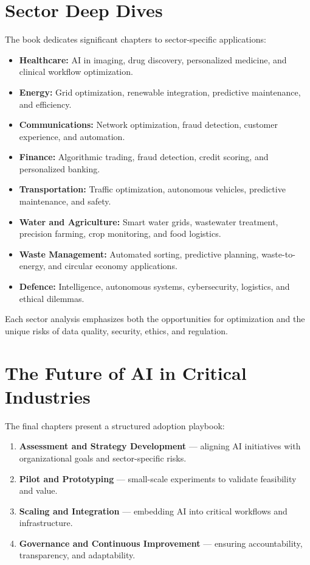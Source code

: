 \section*{Sector Deep Dives}
The book dedicates significant chapters to sector-specific applications: 
\begin{itemize}
    \item \textbf{Healthcare:} AI in imaging, drug discovery, personalized medicine, and clinical workflow optimization. 
    \item \textbf{Energy:} Grid optimization, renewable integration, predictive maintenance, and efficiency. 
    \item \textbf{Communications:} Network optimization, fraud detection, customer experience, and automation. 
    \item \textbf{Finance:} Algorithmic trading, fraud detection, credit scoring, and personalized banking. 
    \item \textbf{Transportation:} Traffic optimization, autonomous vehicles, predictive maintenance, and safety. 
    \item \textbf{Water and Agriculture:} Smart water grids, wastewater treatment, precision farming, crop monitoring, and food logistics. 
    \item \textbf{Waste Management:} Automated sorting, predictive planning, waste-to-energy, and circular economy applications. 
    \item \textbf{Defence:} Intelligence, autonomous systems, cybersecurity, logistics, and ethical dilemmas. 
\end{itemize}
Each sector analysis emphasizes both the opportunities for optimization and the unique risks of data quality, security, 
ethics, and regulation. 

\section*{The Future of AI in Critical Industries}
The final chapters present a structured adoption playbook: 
\begin{enumerate}
    \item \textbf{Assessment and Strategy Development} --- aligning AI initiatives with organizational goals and sector-specific risks. 
    \item \textbf{Pilot and Prototyping} --- small-scale experiments to validate feasibility and value. 
    \item \textbf{Scaling and Integration} --- embedding AI into critical workflows and infrastructure. 
    \item \textbf{Governance and Continuous Improvement} --- ensuring accountability, transparency, and adaptability. 
\end{enumerate}

